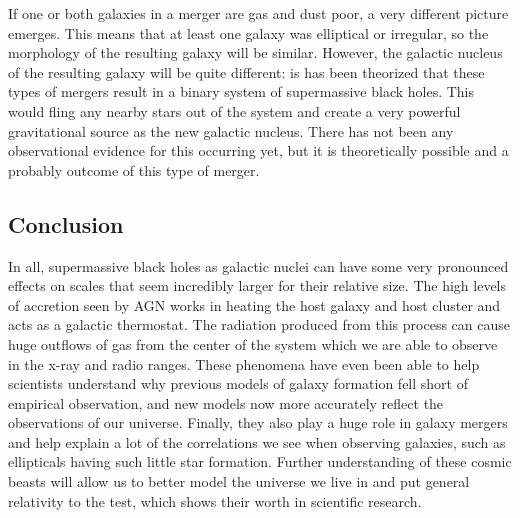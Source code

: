 \documentclass[12pt]{article}
\begin{document}
If one or both galaxies in a merger are gas and dust poor, a very different
picture emerges.  This means that at least one galaxy was elliptical or
irregular, so the morphology of the resulting galaxy will be similar.  However,
the galactic nucleus of the resulting galaxy will be quite different: is has
been theorized that these types of mergers result in a binary system of
supermassive black holes.  This would fling any nearby stars out of the system
and create a very powerful gravitational source as the new galactic nucleus.
There has not been any observational evidence for this occurring yet, but it is
theoretically possible and a probably outcome of this type of merger.

\subsection{Conclusion}
In all, supermassive black holes as galactic nuclei can have some very
pronounced effects on scales that seem incredibly larger for their relative
size.  The high levels of accretion seen by AGN works in heating the host galaxy
and host cluster and acts as a galactic thermostat.  The radiation produced from
this process can cause huge outflows of gas from the center of the system which
we are able to observe in the x-ray and radio ranges.  These phenomena have even
been able to help scientists understand why previous models of galaxy formation
fell short of empirical observation, and new models now more accurately reflect
the observations of our universe.  Finally, they also play a huge role in galaxy
mergers and help explain a lot of the correlations we see when observing
galaxies, such as ellipticals having such little star formation.  Further
understanding of these cosmic beasts will allow us to better model the universe
we live in and put general relativity to the test, which shows their worth in
scientific research.
\end{document}
